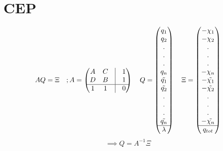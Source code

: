 \documentclass[12pt,english]{article}
\begin{document}
	\section{CEP}
	\begin{equation}
	A Q = \Xi\hspace{10pt} ; 
	A = 
	\begin{pmatrix}
		A & C & \vline & 1\\
		D & B & \vline & 1\\
		\hline
		1 & 1 & \vline & 0
	\end{pmatrix}
	\hspace{10pt}
	Q = 
	\begin{pmatrix}
		q_1 \\ q_2 \\ .\\.\\.\\q_n\\\tilde{q_1}\\\tilde{q_2}\\.\\.\\.\\\tilde{q_n}\\\hline\lambda
	\end{pmatrix}
	\hspace{10pt}
	\Xi = 
	\begin{pmatrix}
	-\chi_1 \\ -\chi_2 \\ .\\.\\.\\-\chi_n\\-\tilde{\chi_1}\\-\tilde{\chi_2}\\.\\.\\.\\-\tilde{\chi_n}\\\hline q_{tot}
	\end{pmatrix}
	\end{equation}
	\begin{equation}
		\implies
		Q = A^{-1}\Xi
	\end{equation}
	
\end{document}
